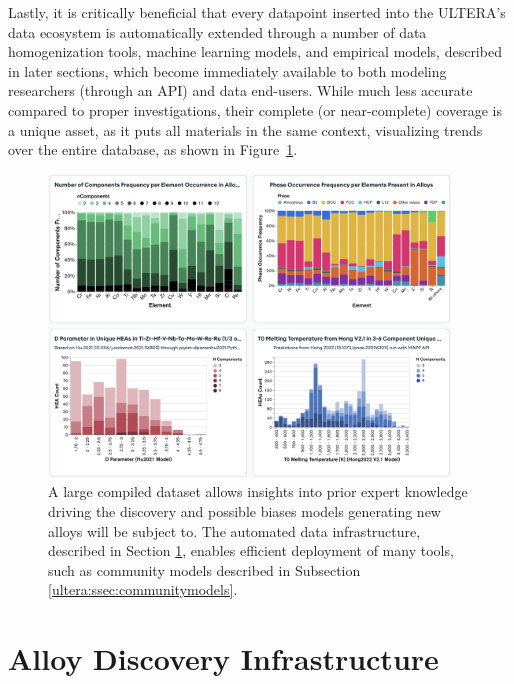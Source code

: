 Lastly, it is critically beneficial that every datapoint inserted into the ULTERA's data ecosystem is automatically extended through a number of data homogenization tools, machine learning models, and empirical models, described in later sections, which become immediately available to both modeling researchers (through an API) and data end-users. While much less accurate compared to proper investigations, their complete (or near-complete) coverage is a unique asset, as it puts all materials in the same context, visualizing trends over the entire database, as shown in Figure~\ref{ultera:fig:insights}.

\begin{figure}[H]
    \centering
    \includegraphics[width=0.95\textwidth]{ultera/ULTERA_Insights.png}
    \caption{A large compiled dataset allows insights into prior expert knowledge driving the discovery and possible biases models generating new alloys will be subject to. The automated data infrastructure, described in Section \ref{ultera:sec:infrastructure}, enables efficient deployment of many tools, such as community models described in Subsection \ref{ultera:ssec:communitymodels}.}
    \label{ultera:fig:insights}
\end{figure}


\section{Alloy Discovery Infrastructure} \label{ultera:sec:infrastructure}

